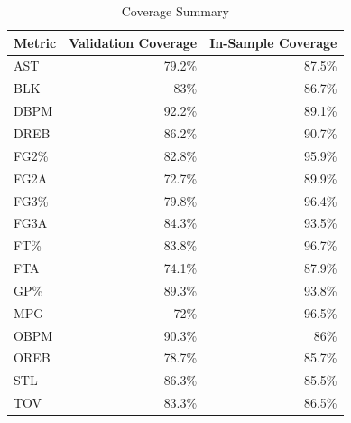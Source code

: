 \begin{table}[t]
\caption*{
{\large Coverage Summary}
} 
\fontsize{12.0pt}{14.4pt}\selectfont
\begin{tabular*}{\linewidth}{@{\extracolsep{\fill}}lrr}
\toprule
Metric & Validation Coverage & In-Sample Coverage \\ 
\midrule\addlinespace[2.5pt]
AST & 79.2\% & 87.5\% \\ 
BLK & 83\% & 86.7\% \\ 
DBPM & 92.2\% & 89.1\% \\ 
DREB & 86.2\% & 90.7\% \\ 
FG2\% & 82.8\% & 95.9\% \\ 
FG2A & 72.7\% & 89.9\% \\ 
FG3\% & 79.8\% & 96.4\% \\ 
FG3A & 84.3\% & 93.5\% \\ 
FT\% & 83.8\% & 96.7\% \\ 
FTA & 74.1\% & 87.9\% \\ 
GP\% & 89.3\% & 93.8\% \\ 
MPG & 72\% & 96.5\% \\ 
OBPM & 90.3\% & 86\% \\ 
OREB & 78.7\% & 85.7\% \\ 
STL & 86.3\% & 85.5\% \\ 
TOV & 83.3\% & 86.5\% \\ 
\bottomrule
\end{tabular*}
\end{table}

